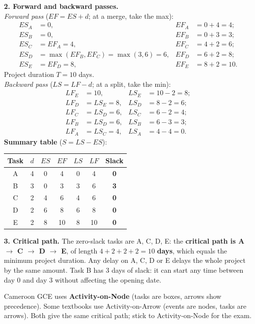 \documentclass[11pt]{article}
\begin{document}
\begin{exoresolu}
\textbf{2. Forward and backward passes.}\\
\emph{Forward pass} ($EF = ES + d$; at a merge, take the max):
\begin{align*}
ES_A &= 0, & EF_A &= 0+4 = 4;\\
ES_B &= 0, & EF_B &= 0+3 = 3;\\
ES_C &= EF_A = 4, & EF_C &= 4+2 = 6;\\
ES_D &= \max(EF_B, EF_C) = \max(3,6) = 6, & EF_D &= 6+2 = 8;\\
ES_E &= EF_D = 8, & EF_E &= 8+2 = 10.
\end{align*}
Project duration $T = 10$ days.\\
\emph{Backward pass} ($LS = LF - d$; at a split, take the min):
\begin{align*}
LF_E &= 10, & LS_E &= 10-2 = 8;\\
LF_D &= LS_E = 8, & LS_D &= 8-2 = 6;\\
LF_C &= LS_D = 6, & LS_C &= 6-2 = 4;\\
LF_B &= LS_D = 6, & LS_B &= 6-3 = 3;\\
LF_A &= LS_C = 4, & LS_A &= 4-4 = 0.
\end{align*}
\textbf{Summary table} ($S = LS - ES$):
\begin{center}
\begin{tabular}{|c|c|c|c|c|c|c|}\hline
\rowcolor{popblueL} \textbf{Task} & $d$ & $ES$ & $EF$ & $LS$ & $LF$ & \textbf{Slack} \\ \hline
A & 4 & 0 & 4 & 0 & 4 & \textbf{0} \\ \hline
B & 3 & 0 & 3 & 3 & 6 & \textbf{3} \\ \hline
C & 2 & 4 & 6 & 4 & 6 & \textbf{0} \\ \hline
D & 2 & 6 & 8 & 6 & 8 & \textbf{0} \\ \hline
E & 2 & 8 & 10 & 8 & 10 & \textbf{0} \\ \hline
\end{tabular}
\end{center}

\textbf{3. Critical path.} The zero-slack tasks are A, C, D, E: the \textbf{critical path is A $\to$ C $\to$ D $\to$ E}, of length $4+2+2+2 = 10$ \textbf{days}, which equals the minimum project duration. Any delay on A, C, D or E delays the whole project by the same amount. Task B has 3 days of slack: it can start any time between day 0 and day 3 without affecting the opening date.
\end{exoresolu}

\begin{savaistu}
Cameroon GCE uses \textbf{Activity-on-Node} (tasks are boxes, arrows show precedence). Some textbooks use Activity-on-Arrow (events are nodes, tasks are arrows). Both give the same critical path; stick to Activity-on-Node for the exam.
\end{savaistu}
\end{document}
